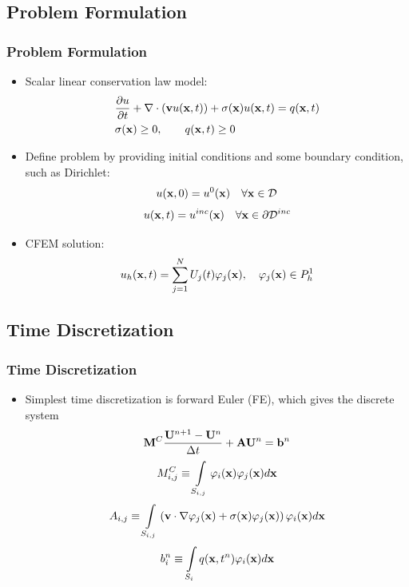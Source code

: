 \documentclass{beamer}
\begin{document}
\subsection{Problem Formulation}
\begin{frame}
\frametitle{Problem Formulation}

\begin{itemize}
   \item Scalar linear conservation law model:
   \begin{align}
      &\frac{\partial u}{\partial t} + \nabla\cdot(\mathbf{v}u(\mathbf{x},t))
      + \sigma(\mathbf{x})u(\mathbf{x},t) = q(\mathbf{x},t)\\
      &\sigma(\mathbf{x})\ge 0,\qquad q(\mathbf{x},t)\ge 0\nonumber
   \end{align}
   \item Define problem by providing initial conditions and some boundary
      condition, such as Dirichlet:
   \begin{equation}
      u(\mathbf{x},0) = u^0(\mathbf{x}) \quad \forall \mathbf{x}\in \mathcal{D}
   \end{equation}
   \begin{equation}
      u(\mathbf{x},t) = u^{inc}(\mathbf{x}) \quad \forall \mathbf{x}\in \partial \mathcal{D}^{inc}
   \end{equation}
   \item CFEM solution:
   \begin{equation}
      u_h(\mathbf{x},t) = \sum\limits_{j=1}^N U_j(t) \varphi_j(\mathbf{x}),
      \quad \varphi_j(\mathbf{x})\in P^1_h
   \end{equation}
\end{itemize}

\end{frame}
\subsection{Time Discretization}
\begin{frame}
\frametitle{Time Discretization}

\begin{itemize}
   \item Simplest time discretization is forward Euler (FE), which gives the
      discrete system
   \begin{equation}
      \mathbf{M}^C\frac{\mathbf{U}^{n+1}-\mathbf{U}^n}{\Delta t} + \mathbf{A}\mathbf{U}^n = \mathbf{b}^n
   \end{equation}
   \begin{equation}
      M_{i,j}^C \equiv \int\limits_{S_{i,j}}\varphi_i(\mathbf{x}) \varphi_j(\mathbf{x}) d\mathbf{x}
   \end{equation}
   \begin{equation}
      A_{i,j} \equiv \int\limits_{S_{i,j}}\left(
      \mathbf{v}\cdot\nabla\varphi_j(\mathbf{x}) +
		\sigma(\mathbf{x})\varphi_j(\mathbf{x})\right)\varphi_i(\mathbf{x}) d\mathbf{x}
   \end{equation}
   \begin{equation}
      b_i^n \equiv \int\limits_{S_i} q(\mathbf{x},t^n)\varphi_i(\mathbf{x}) d\mathbf{x}
   \end{equation}
\end{itemize}

\end{frame}
\end{document}
